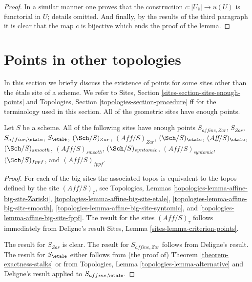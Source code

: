 \begin{proof}
\medskip\noindent
In a similar manner one proves that the construction
$c : |U_{\overline{s}}| \to u(U)$ is functorial in $U$;
details omitted. And finally, by the results of the
third paragraph it is clear that the map $c$ is bijective
which ends the proof of the lemma.
\end{proof}







\section{Points in other topologies}
\label{section-points-topologies}

\noindent
In this section we briefly discuss the existence of points for some
sites other than the \'etale site of a scheme. We refer to
Sites, Section \ref{sites-section-sites-enough-points}
and
Topologies, Section \ref{topologies-section-procedure} ff
for the terminology used in this section.
All of the geometric sites have enough points.

\begin{lemma}
\label{lemma-points-fppf}
Let $S$ be a scheme. All of the following sites have enough points
$S_{affine, Zar}$, $S_{Zar}$, $S_{affine, \etale}$, $S_\etale$,
$(\Sch/S)_{Zar}$, $(\textit{Aff}/S)_{Zar}$,
$(\Sch/S)_\etale$, $(\textit{Aff}/S)_\etale$,
$(\Sch/S)_{smooth}$, $(\textit{Aff}/S)_{smooth}$,
$(\Sch/S)_{syntomic}$, $(\textit{Aff}/S)_{syntomic}$,
$(\Sch/S)_{fppf}$, and $(\textit{Aff}/S)_{fppf}$.
\end{lemma}

\begin{proof}
For each of the big sites the associated topos is equivalent to the
topos defined by the site $(\textit{Aff}/S)_\tau$, see
Topologies, Lemmas \ref{topologies-lemma-affine-big-site-Zariski},
\ref{topologies-lemma-affine-big-site-etale},
\ref{topologies-lemma-affine-big-site-smooth},
\ref{topologies-lemma-affine-big-site-syntomic}, and
\ref{topologies-lemma-affine-big-site-fppf}.
The result for the sites $(\textit{Aff}/S)_\tau$ follows immediately
from Deligne's result
Sites, Lemma \ref{sites-lemma-criterion-points}.

\medskip\noindent
The result for $S_{Zar}$ is clear. The result for $S_{affine, Zar}$
follows from Deligne's result. The result for $S_\etale$
either follows from (the proof of)
Theorem \ref{theorem-exactness-stalks}
or from Topologies, Lemma \ref{topologies-lemma-alternative}
and Deligne's result applied to $S_{affine, \etale}$.
\end{proof}

